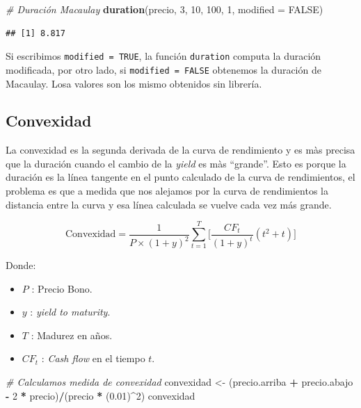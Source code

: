 \documentclass[12pt,]{book}
\newenvironment{Shaded}{\begin{snugshade}}{\end{snugshade}}
\newcommand{\KeywordTok}[1]{\textcolor[rgb]{0.13,0.29,0.53}{\textbf{#1}}}
\newcommand{\DataTypeTok}[1]{\textcolor[rgb]{0.13,0.29,0.53}{#1}}
\newcommand{\DecValTok}[1]{\textcolor[rgb]{0.00,0.00,0.81}{#1}}
\newcommand{\FloatTok}[1]{\textcolor[rgb]{0.00,0.00,0.81}{#1}}
\newcommand{\StringTok}[1]{\textcolor[rgb]{0.31,0.60,0.02}{#1}}
\newcommand{\CommentTok}[1]{\textcolor[rgb]{0.56,0.35,0.01}{\textit{#1}}}
\newcommand{\OtherTok}[1]{\textcolor[rgb]{0.56,0.35,0.01}{#1}}
\newcommand{\OperatorTok}[1]{\textcolor[rgb]{0.81,0.36,0.00}{\textbf{#1}}}
\newcommand{\NormalTok}[1]{#1}
\providecommand{\tightlist}{%
  \setlength{\itemsep}{0pt}\setlength{\parskip}{0pt}}
\begin{document}
\begin{Shaded}
\begin{Highlighting}[]
\CommentTok{# Duración Macaulay}
\KeywordTok{duration}\NormalTok{(precio, }\DecValTok{3}\NormalTok{, }\DecValTok{10}\NormalTok{, }\DecValTok{100}\NormalTok{, }\DecValTok{1}\NormalTok{, }\DataTypeTok{modified =} \OtherTok{FALSE}\NormalTok{)}
\end{Highlighting}
\end{Shaded}

\begin{verbatim}
## [1] 8.817
\end{verbatim}

Si escribimos \texttt{modified\ =\ TRUE}, la función \texttt{duration}
computa la duración modificada, por otro lado, si
\texttt{modified\ =\ FALSE} obtenemos la duración de Macaulay. Losa
valores son los mismo obtenidos sin librería.

\subsection{Convexidad}\label{convexidad}

La convexidad es la segunda derivada de la curva de rendimiento y es màs
precisa que la duración cuando el cambio de la \emph{yield} es màs
``grande''. Esto es porque la duración es la línea tangente en el punto
calculado de la curva de rendimientos, el problema es que a medida que
nos alejamos por la curva de rendimientos la distancia entre la curva y
esa línea calculada se vuelve cada vez más grande.

\[
\text{Convexidad} = \frac{1}{P \times (1+y)^2} \sum_{t=1}^{T} \bigg[ \frac{CF_{t}}{(1 + y)^t } (t^2 + t) \bigg]
\]

Donde:

\begin{itemize}
\tightlist
\item
  \(P\) : Precio Bono.
\item
  \(y\) : \emph{yield to maturity}.
\item
  \(T\) : Madurez en años.
\item
  \(CF_{t}\) : \emph{Cash flow} en el tiempo \(t\).
\end{itemize}

\begin{Shaded}
\begin{Highlighting}[]
\CommentTok{# Calculamos medida de convexidad}
\NormalTok{convexidad <-}\StringTok{ }\NormalTok{(precio.arriba }\OperatorTok{+}\StringTok{ }\NormalTok{precio.abajo  }\OperatorTok{-}\StringTok{ }\DecValTok{2} \OperatorTok{*}\StringTok{ }\NormalTok{precio)}\OperatorTok{/}\NormalTok{(precio }\OperatorTok{*}\StringTok{ }\NormalTok{(}\FloatTok{0.01}\NormalTok{)}\OperatorTok{^}\DecValTok{2}\NormalTok{)}
\NormalTok{convexidad}
\end{Highlighting}
\end{Shaded}
\end{document}
